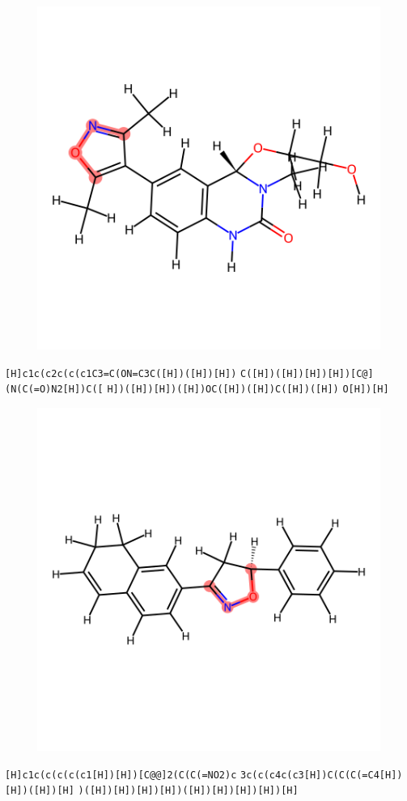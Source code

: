 \documentclass{article}
\begin{document}
\begin{figure}[ht]
\centering
    \includegraphics{mol184.png}
\end{figure}
\verb|[H]c1c(c2c(c(c1C3=C(ON=C3C([H])([H])[H])| \verb|C([H])([H])[H])[H])[C@](N(C(=O)N2[H])C([| \verb|H])([H])[H])([H])OC([H])([H])C([H])([H])| \verb|O[H])[H]|

\begin{figure}[ht]
\centering
    \includegraphics{mol185.png}
\end{figure}
\verb|[H]c1c(c(c(c(c1[H])[H])[C@@]2(C(C(=NO2)c| \verb|3c(c(c4c(c3[H])C(C(C(=C4[H])[H])([H])[H]| \verb|)([H])[H])[H])[H])([H])[H])[H])[H])[H]|
\end{document}
